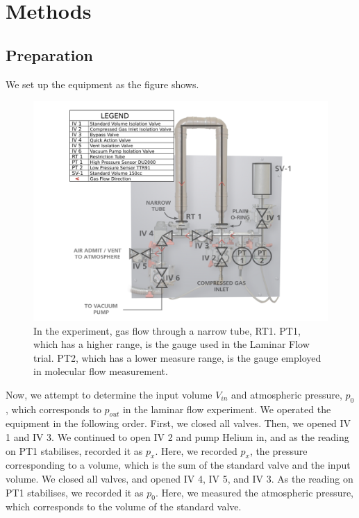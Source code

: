 \documentclass[12pt,a4paper]{article}
\begin{document}
	\section{Methods}
	\subsection{Preparation}
	We set up the equipment as the figure shows.
	\begin{figure}[h!]\label{Apparatus}
		\begin{center}
			\includegraphics[scale=0.3]{Gas_Flow_apparatus.png}
			\caption{In the experiment, gas flow through a narrow tube, RT1. PT1, which has a higher range, is the gauge used in the Laminar Flow trial. PT2, which has a lower measure range, is the gauge employed in molecular flow measurement.\cite{Lab_Instruction}
}
		\end{center}
	\end{figure}
	
	Now, we attempt to determine the input volume $V_{in}$ and atmospheric pressure, $p_0$, which corresponds to $p_{out}$ in the laminar flow experiment.
	We operated the equipment in the following order.
	First, we closed all valves. Then, we opened IV 1 and IV 3. We continued to open IV 2 and pump Helium in, and as the reading on PT1 stabilises, recorded it as $p_x$. Here, we recorded $p_x$, the pressure corresponding to a volume, which is the sum of the standard valve and the input volume. We closed all valves, and opened IV 4, IV 5, and IV 3. As the reading on PT1 stabilises, we recorded it as $p_0$. Here, we measured the atmospheric pressure, which corresponds to the volume of the standard valve.  
	
\end{document}
